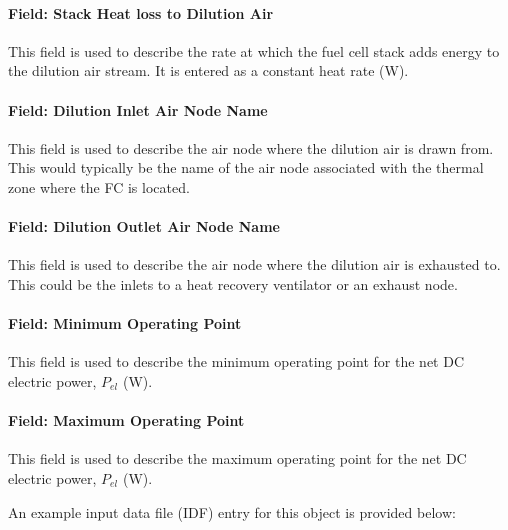\paragraph{Field: Stack Heat loss to Dilution Air}\label{field-stack-heat-loss-to-dilution-air}

This field is used to describe the rate at which the fuel cell stack adds energy to the dilution air stream. It is entered as a constant heat rate (W).

\paragraph{Field: Dilution Inlet Air Node Name}\label{field-dilution-inlet-air-node-name}

This field is used to describe the air node where the dilution air is drawn from. This would typically be the name of the air node associated with the thermal zone where the FC is located.

\paragraph{Field: Dilution Outlet Air Node Name}\label{field-dilution-outlet-air-node-name}

This field is used to describe the air node where the dilution air is exhausted to. This could be the inlets to a heat recovery ventilator or an exhaust node.

\paragraph{Field: Minimum Operating Point}\label{field-minimum-operating-point}

This field is used to describe the minimum operating point for the net DC electric power, \({P_{el}}\) (W).

\paragraph{Field: Maximum Operating Point}\label{field-maximum-operating-point}

This field is used to describe the maximum operating point for the net DC electric power, \({P_{el}}\) (W).

An example input data file (IDF) entry for this object is provided below:

